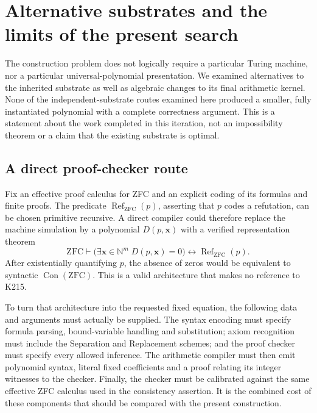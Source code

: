 \section{Alternative substrates and the limits of the present search}
\label{sec:alternative-substrates}

The construction problem does not logically require a particular Turing
machine, nor a particular universal-polynomial presentation.  We examined
alternatives to the inherited substrate as well as algebraic changes to its
final arithmetic kernel.  None of the independent-substrate routes examined
here produced a smaller, fully instantiated polynomial with a complete
correctness argument.  This is a statement about the work completed in this
iteration, not an impossibility theorem or a claim that the existing
substrate is optimal.

\subsection{A direct proof-checker route}

Fix an effective proof calculus for ZFC and an explicit coding of its
formulas and finite proofs.  The predicate
\(\operatorname{Ref}_{\mathrm{ZFC}}(p)\), asserting that \(p\) codes a
refutation, can be chosen primitive recursive.  A direct compiler could
therefore replace the machine simulation by a polynomial
\(D(p,\mathbf x)\) with a verified representation theorem
\[
 \mathrm{ZFC}\vdash
 \bigl(\exists\mathbf x\in\mathbb N^m\;
       D(p,\mathbf x)=0\bigr)
 \longleftrightarrow \operatorname{Ref}_{\mathrm{ZFC}}(p).
\]
After existentially quantifying \(p\), the absence of zeros would be
equivalent to syntactic \(\operatorname{Con}(\mathrm{ZFC})\).  This is a
valid architecture that makes no reference to K215.

To turn that architecture into the requested fixed equation, the following
data and arguments must actually be supplied.  The syntax encoding must
specify formula parsing, bound-variable handling and substitution; axiom
recognition must include the Separation and Replacement schemes; and the
proof checker must specify every allowed inference.  The arithmetic
compiler must then emit polynomial syntax, literal fixed coefficients and
a proof relating its integer witnesses to the checker.  Finally, the
checker must be calibrated against the same effective ZFC calculus used in
the consistency assertion.  It is the combined cost of these components
that should be compared with the present construction.

